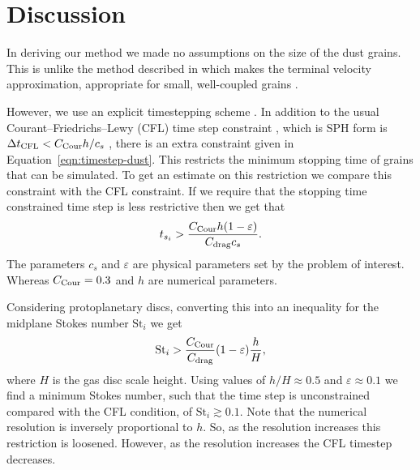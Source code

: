 \documentclass[fleqn,usenatbib]{mnras}
\begin{document}
\section{Discussion}%
\label{sec:discussion}

In deriving our method we made no assumptions on the size of the dust grains.
This is unlike the method described in \citet{Hutchison2018MNRAS.476.2186H}
which makes the terminal velocity approximation, appropriate for small,
well-coupled grains \citep{Youdin2005ApJ...620..459Y}.

However, we use an explicit timestepping scheme
\citep{Price2018PASA...35...31P}. In addition to the usual
Courant–Friedrichs–Lewy (CFL) time step constraint
\citep{Courant1928MatAn.100...32C}, which is SPH form is \(\Delta t_{\rm CFL} <
C_{\rm Cour} h/c_s\) \citep{Price2018PASA...35...31P}, there is an extra
constraint given in Equation~\ref{eqn:timestep-dust}. This restricts the minimum
stopping time of grains that can be simulated. To get an estimate on this
restriction we compare this constraint with the CFL constraint. If we require
that the stopping time constrained time step is less restrictive then we get
that
%
\begin{align}
   t_{s_i} > \frac{C_{\rm Cour} h (1 - \varepsilon)}{C_{\rm drag} c_s}.
\end{align}
%
The parameters \(c_s\) and \(\varepsilon\) are physical parameters set by the
problem of interest. Whereas \(C_{\rm Cour} = 0.3\) and \(h\) are numerical
parameters.

Considering protoplanetary discs, converting this into an inequality for the
midplane Stokes number \(\mathrm{St}_i\) we get
%
\begin{align}
   \mathrm{St}_i > \frac{C_{\rm Cour}}{C_{\rm drag}} (1 - \varepsilon) \frac{h}{H},
\end{align}
%
where \(H\) is the gas disc scale height. Using values of \(h/H \approx 0.5\)
and \(\varepsilon \approx 0.1\) we find a minimum Stokes number, such that the
time step is unconstrained compared with the CFL condition, of \(\mathrm{St}_i
\gtrsim 0.1\). Note that the numerical resolution is inversely proportional to
\(h\). So, as the resolution increases this restriction is loosened. However, as
the resolution increases the CFL timestep decreases.
\end{document}
